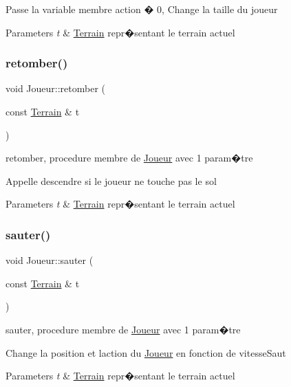 Passe la variable membre action � 0, Change la taille du joueur 
\begin{DoxyParams}{Parameters}
{\em t} & \hyperlink{classTerrain}{Terrain} repr�sentant le terrain actuel \\
\hline
\end{DoxyParams}
\mbox{\label{classJoueur_a51fdc4e21c02856d8b2d1c448e4c84e7}} 
\subsubsection{\texorpdfstring{retomber()}{retomber()}}
{\footnotesize\ttfamily void Joueur\+::retomber (\begin{DoxyParamCaption}\item[{const \hyperlink{classTerrain}{Terrain} \&}]{t }\end{DoxyParamCaption})}



retomber, procedure membre de \hyperlink{classJoueur}{Joueur} avec 1 param�tre 

Appelle descendre si le joueur ne touche pas le sol 
\begin{DoxyParams}{Parameters}
{\em t} & \hyperlink{classTerrain}{Terrain} repr�sentant le terrain actuel \\
\hline
\end{DoxyParams}
\mbox{\label{classJoueur_a7299a7891687e5d67180e6375f56a2bb}} 
\subsubsection{\texorpdfstring{sauter()}{sauter()}}
{\footnotesize\ttfamily void Joueur\+::sauter (\begin{DoxyParamCaption}\item[{const \hyperlink{classTerrain}{Terrain} \&}]{t }\end{DoxyParamCaption})}



sauter, procedure membre de \hyperlink{classJoueur}{Joueur} avec 1 param�tre 

Change la position et l\textquotesingle{}action du \hyperlink{classJoueur}{Joueur} en fonction de vitesse\+Saut 
\begin{DoxyParams}{Parameters}
{\em t} & \hyperlink{classTerrain}{Terrain} repr�sentant le terrain actuel \\
\hline
\end{DoxyParams}
\mbox{\label{classJoueur_a72a334ac1d22b59bbe945d84de288b28}} 
